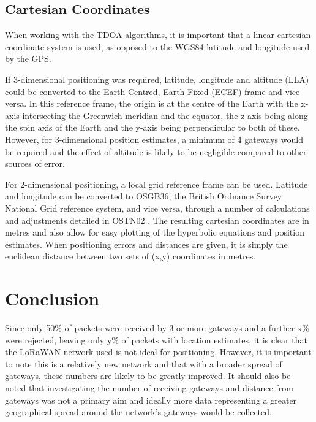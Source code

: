\documentclass[a4paper]{report}
\begin{document}
  \section{Cartesian Coordinates}
    When working with the TDOA algorithms, it is important that a linear cartesian coordinate system is used, as opposed to the WGS84 latitude and longitude used by the GPS.

    If 3-dimensional positioning was required, latitude, longitude and altitude (LLA) could be converted to the Earth Centred, Earth Fixed (ECEF) frame and vice versa. In this reference frame, the origin is at the centre of the Earth with the x-axis intersecting the Greenwich meridian and the equator, the z-axis being along the spin axis of the Earth and the y-axis being perpendicular to both of these. However, for 3-dimensional position estimates, a minimum of 4 gateways would be required and the effect of altitude is likely to be negligible compared to other sources of error.

    For 2-dimensional positioning, a local grid reference frame can be used. Latitude and longitude can be converted to OSGB36, the British Ordnance Survey National Grid reference system, and vice versa, through a number of calculations and adjustments detailed in OSTN02 \cite{OSTN02}. The resulting cartesian coordinates are in metres and also allow for easy plotting of the hyperbolic equations and position estimates. When positioning errors and distances are given, it is simply the euclidean distance between two sets of (x,y) coordinates in metres.





\chapter{Conclusion}

  Since only 50\% of packets were received by 3 or more gateways and a further x\% were rejected, leaving only y\% of packets with location estimates, it is clear that the LoRaWAN network used is not ideal for positioning. However, it is important to note this is a relatively new network and that with a broader spread of gateways, these numbers are likely to be greatly improved. It should also be noted that investigating the number of receiving gateways and distance from gateways was not a primary aim and ideally more data representing a greater geographical spread around the network's gateways would be collected.
\end{document}
